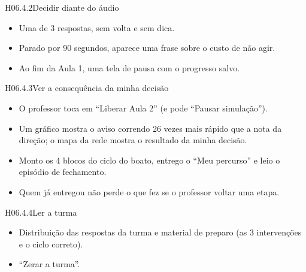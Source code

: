 \begin{historia}{H06.4.2}{Decidir diante do áudio}{\pronto}
\aceite
\begin{itemize}
  \item Uma de 3 respostas, sem volta e sem dica.
  \item Parado por 90 segundos, aparece uma frase sobre o custo de não agir.
  \item Ao fim da Aula 1, uma tela de pausa com o progresso salvo.
\end{itemize}
\end{historia}

\begin{historia}{H06.4.3}{Ver a consequência da minha decisão}{\pronto}
\aceite
\begin{itemize}
  \item O professor toca em \enquote{Liberar Aula 2} (e pode \enquote{Pausar
    simulação}).
  \item Um gráfico mostra o aviso correndo 26 vezes mais rápido que a nota da
    direção; o mapa da rede mostra o resultado da minha decisão.
  \item Monto os 4 blocos do ciclo do boato, entrego o \enquote{Meu
    percurso} e leio o episódio de fechamento.
  \item Quem já entregou não perde o que fez se o professor voltar uma etapa.
\end{itemize}
\end{historia}

\begin{historia}{H06.4.4}{Ler a turma}{\parcial}
\aceite
\begin{itemize}
  \item Distribuição das respostas da turma e material de preparo (as 3
    intervenções e o ciclo correto).
  \item \enquote{Zerar a turma}.
\end{itemize}
\end{historia}


